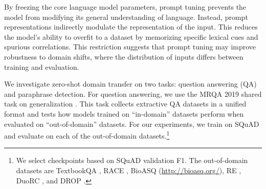\documentclass[11pt]{article}
\begin{document}
\begin{table}[]
\centering
\footnotesize
{}
\caption{
F1 mean and stddev for models trained on SQuAD and evaluated on out-of-domain datasets from the MRQA 2019 shared task. Prompt tuning tends to give stronger zero-shot performance than model tuning, especially on datasets with large domain shifts like TextbookQA. %
}
\label{tab:domain-squad}
\end{table}

By freezing the core language model parameters, prompt tuning prevents the model from modifying its general understanding of language. Instead, prompt representations indirectly modulate the representation of the input. This reduces the model's ability to overfit to a dataset by memorizing specific lexical cues and spurious correlations. This restriction suggests that prompt tuning may improve robustness to domain shifts, where the distribution of inputs differs between training and evaluation.

We investigate zero-shot domain transfer on two tasks: question answering (QA) and paraphrase detection. For question answering, we use the MRQA 2019 shared task on generalization \cite{fisch2019mrqa}. This task collects extractive QA datasets in a unified format and tests how models trained on ``in-domain'' datasets perform when evaluated on ``out-of-domain'' datasets. For our experiments, we train on SQuAD \cite{rajpurkar-etal-2016-squad} and evaluate on each of the out-of-domain datasets.\footnote{We select checkpoints based on SQuAD validation F1. The out-of-domain datasets are TextbookQA \cite{8100054}, RACE \cite{lai-etal-2017-race}, BioASQ (\url{http://bioasq.org/}), RE \cite{levy-etal-2017-zero}, DuoRC \cite{saha-etal-2018-duorc}, and DROP \cite{dua-etal-2019-drop}.}
\end{document}
